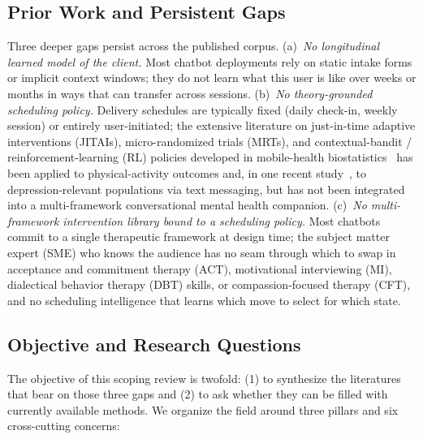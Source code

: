 \documentclass[11pt,a4paper]{article}
\begin{document}
\subsection{Prior Work and Persistent Gaps}\label{sec:prior-work}

Three deeper gaps persist across the published corpus.
(a)~\emph{No longitudinal learned model of the client.} Most chatbot
deployments rely on static intake forms or implicit context windows;
they do not learn what this user is like over weeks or months in
ways that can transfer across sessions.
(b)~\emph{No theory-grounded scheduling policy.} Delivery schedules
are typically fixed (daily check-in, weekly session) or entirely
user-initiated; the extensive literature on just-in-time adaptive
interventions (JITAIs), micro-randomized trials (MRTs), and
contextual-bandit / reinforcement-learning (RL) policies developed
in mobile-health
biostatistics~\cite{NahumShani2018JITAI,Klasnja2015MRT,Liao2020PersonalizedHeartSteps}
has been applied to physical-activity outcomes and, in one recent
study~\cite{Aguilera2024DIAMANTERL}, to depression-relevant
populations via text messaging, but has not been integrated into a
multi-framework conversational mental health companion.
(c)~\emph{No multi-framework intervention library bound to a
scheduling policy.} Most chatbots commit to a single therapeutic
framework at design time; the subject matter expert (SME) who knows
the audience has no seam through which to swap in acceptance and
commitment therapy (ACT), motivational interviewing (MI), dialectical
behavior therapy (DBT) skills, or compassion-focused therapy (CFT),
and no scheduling intelligence that learns which move to select for
which state.

\subsection{Objective and Research Questions}\label{sec:objective}

The objective of this scoping review is twofold: (1) to synthesize
the literatures that bear on those three gaps and (2) to ask whether
they can be filled with currently available methods. We organize the
field around three pillars and six cross-cutting concerns:
\end{document}
